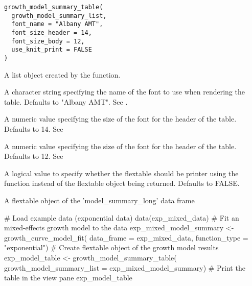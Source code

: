 \documentclass[a4paper]{book}
\begin{document}
%
\begin{Usage}
\begin{verbatim}
growth_model_summary_table(
  growth_model_summary_list,
  font_name = "Albany AMT",
  font_size_header = 14,
  font_size_body = 12,
  use_knit_print = FALSE
)
\end{verbatim}
\end{Usage}
%
\begin{Arguments}
\begin{ldescription}
\item[\code{growth\_model\_summary\_list}] A list object created by the
 function.

\item[\code{font\_name}] A character string specifying the name of the font to use
when rendering the table. Defaults to "Albany AMT".
See .

\item[\code{font\_size\_header}] A numeric value specifying the size of the font
for the header of the table. Defaults to 14.
See 

\item[\code{font\_size\_body}] A numeric value specifying the size of the font
for the header of the table. Defaults to 12.
See 

\item[\code{use\_knit\_print}] A logical value to specify whether the flextable
should be printer using the  function
instead of the flextable object being returned.
Defaults to FALSE.
\end{ldescription}
\end{Arguments}
%
\begin{Value}
A flextable object of the 'model\_summary\_long' data frame
\end{Value}
%
\begin{SeeAlso}
\end{SeeAlso}
%
\begin{Examples}
\begin{ExampleCode}
# Load example data (exponential data)
data(exp_mixed_data)
# Fit an mixed-effects growth model to the data
exp_mixed_model_summary <- growth_curve_model_fit(
data_frame = exp_mixed_data,
function_type = "exponential")
# Create flextable object of the growth model results
exp_model_table <- growth_model_summary_table(
growth_model_summary_list = exp_mixed_model_summary)
# Print the table in the view pane
exp_model_table
\end{ExampleCode}
\end{Examples}
\end{document}
